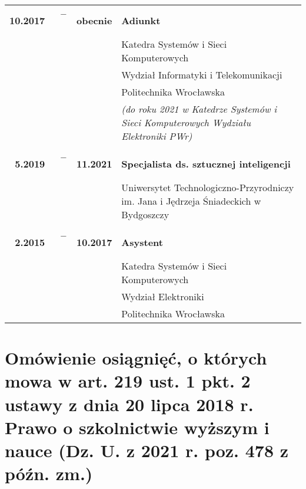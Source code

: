 \vspace{-.5em}\begin{tabular}{r@{}c@{}lp{40em}}
\bfseries 10.2017 & \bfseries~--~ & \bfseries obecnie & \textbf{Adiunkt}\\

&&& Katedra Systemów i Sieci Komputerowych\\
&&& Wydział Informatyki i Telekomunikacji\\
&&& Politechnika Wrocławska\\
&&& \emph{(do roku 2021 w Katedrze Systemów i Sieci Komputerowych Wydziału Elektroniki PWr)}\\\\

\bfseries 5.2019 & \bfseries~--~ & \bfseries 11.2021 & \textbf{Specjalista ds. sztucznej inteligencji}}\\

&&& Uniwersytet Technologiczno-Przyrodniczy im. Jana i Jędrzeja Śniadeckich w Bydgoszczy\\\\

\bfseries 2.2015 & \bfseries~--~ & \bfseries 10.2017 & \textbf{Asystent}\\

&&& Katedra Systemów i Sieci Komputerowych\\
&&& Wydział Elektroniki\\
&&& Politechnika Wrocławska\\

\end{tabular}\vspace{-1em}



\section{Omówienie osiągnięć, o których mowa w art. 219 ust. 1 pkt. 2 ustawy z dnia 20 lipca 2018 r. Prawo o szkolnictwie wyższym i nauce (Dz. U. z 2021 r. poz. 478 z późn. zm.)}


